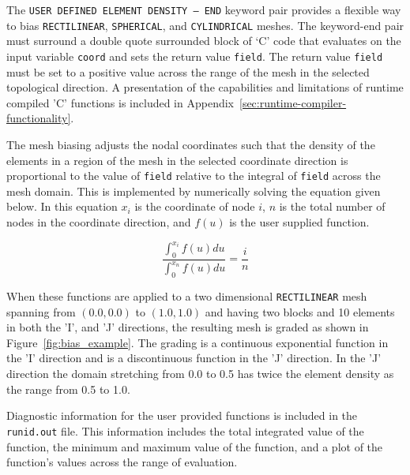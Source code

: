 The \texttt{USER DEFINED ELEMENT DENSITY -- END} keyword pair provides
a flexible way to bias \texttt{RECTILINEAR},
\texttt{SPHERICAL}, and \texttt{CYLINDRICAL} meshes. The keyword-end
pair must surround a double quote surrounded block of `C' code that
evaluates on the input variable \texttt{coord} and sets the return
value \texttt{field}. The return value \texttt{field} must be set to a
positive value across the range of the mesh in the selected
topological direction. A presentation of the capabilities and
limitations of runtime compiled 'C' functions is included in
Appendix~\ref{sec:runtime-compiler-functionality}.

The mesh biasing adjusts the nodal coordinates such that the density
of the elements in a region of the mesh in the selected coordinate
direction is proportional to the value of \texttt{field} relative to
the integral of \texttt{field} across the mesh domain. This is
implemented by numerically solving the equation given below. In this
equation \begin {math} x _ i \end {math} is the coordinate of node
\begin {math} i \end {math}, \begin {math} n \end {math} is the total
number of nodes in the coordinate direction, and \begin {math} f(u)
\end {math} is the user supplied function.

\begin{equation}
   \frac {\int _ {0} ^ {x _ i} f(u)du } {\int _ {0} ^ {x _ n} f(u)du }
   = \frac {i} {n} 
\end{equation}

When these functions are applied to a two dimensional
\texttt{RECTILINEAR} mesh spanning from $(0.0, 0.0)$ to $(1.0, 1.0)$ and
having two blocks and 10 elements in both the 'I', and 'J' directions,
the resulting mesh is graded as shown in
Figure~\ref{fig:bias_example}.  The grading is a continuous
exponential function in the 'I' direction and is a discontinuous
function in the 'J' direction. In the 'J' direction the domain
stretching from 0.0 to 0.5 has twice the element density as the range
from 0.5 to 1.0.

Diagnostic information for the user provided functions is included in
the \texttt{runid.out} file.  This information includes the total
integrated value of the function, the minimum and maximum value of the
function, and a plot of the function's values across the range of
evaluation.


